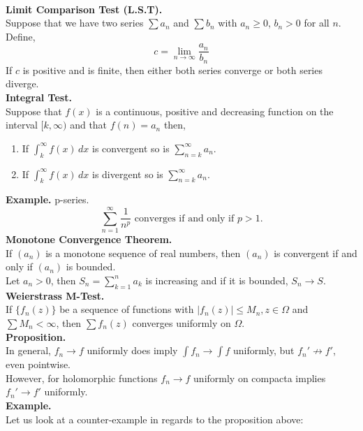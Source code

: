 \documentclass[11pt]{article}
\begin{document}
\  \\
\textbf{Limit Comparison Test (L.S.T).} \\
Suppose that we have two series $\sum {a_n}$ and $\sum {b_n}$ with $a_n \geqslant 0$, $b_n > 0$ for all $n$. Define, 
$$c = \lim_{n \to \infty} \frac{a_n}{b_n} $$
If $c$ is positive and is finite, then either both series converge or both series diverge. \\
\newline
\textbf{Integral Test.} \\
Suppose that $f(x)$ is a continuous, positive and decreasing function on the interval $[k, \infty)$ and that $f(n) = a_n$ then, 
\begin{enumerate}[leftmargin = *]
\item If $\int_k^\infty f(x) \, dx$ is convergent so is $\sum_{n = k}^{\infty} a_n$.
\item If $\int_k^\infty f(x) \, dx$ is divergent so is $\sum_{n = k}^{\infty} a_n$.
\end{enumerate}
\newpage
\textbf{Example.} p-series. 
\begin{equation*}
\sum_{n = 1}^{\infty} \frac{1}{n^p} \mbox{ converges if and only if } p > 1.
\end{equation*}
\newline
\textbf{Monotone Convergence Theorem.} \\
If $(a_n)$ is a monotone sequence of real numbers, then $(a_n)$ is convergent if and only if $(a_n)$ is bounded. \\
Let $a_n > 0$, then $S_n = \sum_{k = 1}^n a_k$ is increasing and if it is bounded, $S_n \to S$. \\
\newline 
\textbf{Weierstrass M-Test.} \\
If $\{f_n(z)\}$ be a sequence of functions with $|f_n(z)| \leqslant M_n, z \in \Omega$ and $\sum {M_n} < \infty$, then $\sum {f_n(z)}$ converges uniformly on $\Omega$. \\
\newline
\textbf{Proposition.} \\
In general, $f_n \to f$ uniformly does imply $\int f_n \to \int f$ uniformly, but $f_n' \nrightarrow f'$, even pointwise. \\
However, for holomorphic functions $f_n \to f$ uniformly on compacta implies $f_n' \to f'$ uniformly. \\
\newline
\textbf{Example.}\\
Let us look at a counter-example in regards to the proposition above: 
\end{document}
